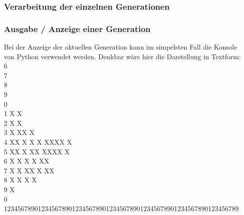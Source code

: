 \subsubsection{Verarbeitung der einzelnen Generationen}

\subsubsection{Ausgabe / Anzeige einer Generation}
Bei der Anzeige der aktuellen Generation kann im simpelsten Fall die Konsole von Python verwendet werden. Denkbar wäre hier die Darstellung in Textform:\\ %
6\\
7\\
8\\
9\\
0\\
1 				X											X\\
2 				X 		X\\
3 		X 	XX 	X\\
4 				XX 		X X				X XXXX X\\
5 				XX 	X 	XX 		XXXX 				X\\
6 		X 	X X X XX\\
7 				X X			XX		X XX\\
8 				X			X	X				X\\
9 				X\\
0\\
123456789012345678901234567890123456789012345678901234567890123456789\\

